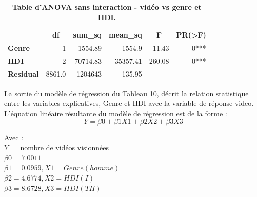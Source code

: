 \documentclass[12pt, a4paper, titlepage, table]{article}
\begin{document}
	\begin{table}[H]
		\centering
		\fontsize{12}{20}\selectfont
		\begin{tabular}{|l|r|r|r|r|r|}
			\hline
					\multicolumn{1}{|c|}{\textbf{}}&
					\multicolumn{1}{c|}{\textbf{df}}&
					\multicolumn{1}{c|}{\textbf{sum\_sq}}&
					\multicolumn{1}{c|}{\textbf{mean\_sq}}&
					\multicolumn{1}{c|}{\textbf{F}}&
					\multicolumn{1}{c|}{\textbf{PR(>F)}}\\
			\hline
				\textbf{Genre}&	1&	1554.89&	1554.9&	11.43&	0***\\
				\textbf{HDI}&	2&	70714.83&	35357.41&	260.08&	0***\\
				\textbf{Residual}&	8861.0&	1204643&	135.95&		&		\\
			\hline
		\end{tabular}
		\caption{\textbf{Table d'ANOVA sans interaction - vidéo vs genre et HDI.}}
	\end{table}

	La sortie du modèle de régression du Tableau 10, décrit la relation statistique entre les variables explicatives, Genre et HDI 
	avec la variable de réponse video. L'équation linéaire résultante du modèle de régression est de la forme : 
	\[ Y=\beta0 + \beta1X1 + \beta2X2 + \beta3X3 \]
	
	Avec :\\
	$Y =$ nombre de vidéos visionnées\\
	$\beta0 = 7.0011$\\
	$\beta1 = 0.0959, X1 = Genre(homme)$\\
	$\beta2 = 4.6774, X2 = HDI(I)$\\
	$\beta3 = 8.6728, X3 = HDI(TH)$\\
	
\end{document}

